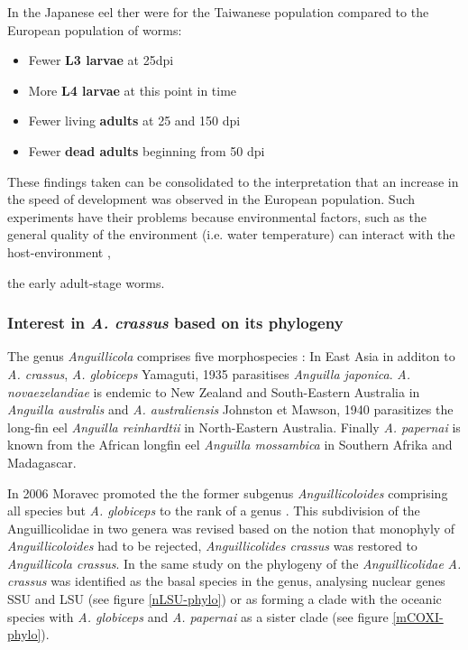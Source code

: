 In the Japanese eel ther were for the Taiwanese population compared to
the European population of worms:
\begin{itemize}
\item Fewer \textbf{L3 larvae} at 25dpi
\item More \textbf{L4 larvae} at this point in time
\item Fewer living \textbf{adults} at 25 and 150 dpi
\item Fewer \textbf{dead adults} beginning from 50 dpi
\end{itemize}

These findings taken can be consolidated to the interpretation that an
increase in the speed of development was observed in the European
population. Such experiments have their problems because environmental
factors, such as the general quality of the environment (i.e. water
temperature) can interact with the host-environment
\cite{kaltz_shykoff_rev}, 


the early adult-stage worms.


\subsubsection{Interest in \textit{A. crassus} based on its
    phylogeny}
\label{phyl-int}

The genus \textit{Anguillicola} comprises five morphospecies
\cite{taraschewski_revision_1988}: In East Asia in additon to
\textit{A. crassus}, \textit{A. globiceps} Yamaguti, 1935
\cite{yamaguti_globiceps} parasitises \textit{Anguilla
  japonica}. \textit{A. novaezelandiae} is endemic to New Zealand and
South-Eastern Australia in \textit{Anguilla australis} and
\textit{A. australiensis} Johnston et Mawson, 1940
\cite{johnston1940some} parasitizes the long-fin eel \textit{Anguilla
  reinhardtii} in North-Eastern Australia. Finally
\textit{A. papernai} is known from the African longfin eel
\textit{Anguilla mossambica} in Southern Afrika and Madagascar.

In 2006 Moravec promoted the the former subgenus
\textit{Anguillicoloides} comprising all species but
\textit{A. globiceps} to the rank of a genus
\cite{moravec_anguillicoloides}. This subdivision of the
Anguillicolidae in two genera was revised based on the notion that
monophyly of \textit{Anguillicoloides} had to be rejected,
\textit{Anguillicolides crassus} was restored to \textit{Anguillicola
  crassus}. In the same study on the phylogeny of the
\textit{Anguillicolidae} \textit{A. crassus} was identified as the
basal species in the genus, analysing nuclear genes SSU and LSU (see
figure \ref{nLSU-phylo}) or as forming a clade with the oceanic
species with \textit{A. globiceps} and \textit{A. papernai} as a
sister clade (see figure \ref{mCOXI-phylo}).

